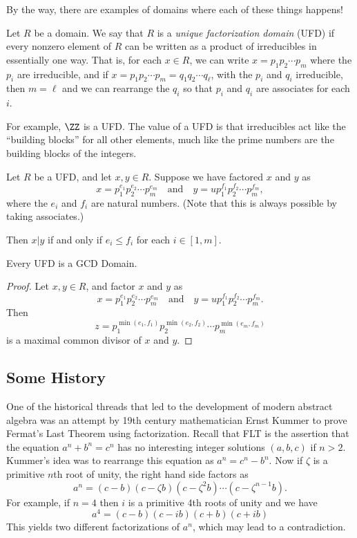 \documentclass{article}
\begin{document}
By the way, there are examples of domains where each of these things happens!

\begin{dfn}
Let $R$ be a domain. We say that $R$ is a \emph{unique factorization domain} (UFD) if every nonzero element of $R$ can be written as a product of irreducibles in essentially one way. That is, for each $x \in R$, we can write $x = p_1 p_2 \cdots p_m$ where the $p_i$ are irreducible, and if $x = p_1 p_2 \cdots p_m = q_1 q_2 \cdots q_\ell$, with the $p_i$ and $q_i$ irreducible, then $m = \ell$ and we can rearrange the $q_i$ so that $p_i$ and $q_i$ are associates for each $i$.
\end{dfn}

For example, $\ZZ$ is a UFD. The value of a UFD is that irreducibles act like the ``building blocks'' for all other elements, much like the prime numbers are the building blocks of the integers.

\begin{lem}
Let $R$ be a UFD, and let $x, y \in R$. Suppose we have factored $x$ and $y$ as \[ x = p_1^{e_1} p_2^{e_2} \cdots p_m^{e_m} \quad \mathrm{and} \quad y = up_1^{f_1} p_2^{f_2} \cdots p_m^{f_m}, \] where the $e_i$ and $f_i$ are natural numbers. (Note that this is always possible by taking associates.)

Then $x|y$ if and only if $e_i \leq f_i$ for each $i \in [1,m]$.
\end{lem}

\begin{prop}
Every UFD is a GCD Domain.
\end{prop}

\begin{proof}
Let $x, y \in R$, and factor $x$ and $y$ as \[ x = p_1^{e_1} p_2^{e_2} \cdots p_m^{e_m} \quad \mathrm{and} \quad y = up_1^{f_1} p_2^{f_2} \cdots p_m^{f_m}. \] Then \[ z = p_1^{\min(e_1,f_1)} p_2^{\min(e_2,f_2)} \cdots p_m^{\min(e_m,f_m)} \] is a maximal common divisor of $x$ and $y$.
\end{proof}

\subsection*{Some History}

One of the historical threads that led to the development of modern abstract algebra was an attempt by 19th century mathematician Ernst Kummer to prove Fermat's Last Theorem using factorization. Recall that FLT is the assertion that the equation $a^n + b^n = c^n$ has no interesting integer solutions $(a,b,c)$ if $n > 2$. Kummer's idea was to rearrange this equation as $a^n = c^n - b^n$. Now if $\zeta$ is a primitive $n$th root of unity, the right hand side factors as \[ a^n = (c - b)(c - \zeta b)(c - \zeta^2 b) \cdots (c - \zeta^{n-1} b). \] For example, if $n = 4$ then $i$ is a primitive 4th roots of unity and we have \[ a^4 = (c - b)(c - ib)(c + b)(c + ib) \] This yields two different factorizations of $a^n$, which may lead to a contradiction.
\end{document}
